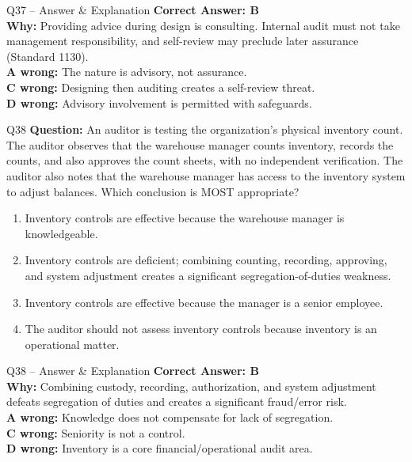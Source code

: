 \documentclass[aspectratio=169,10pt]{beamer}
\begin{document}
	\begin{frame}[t]{Q37 -- Answer \& Explanation}
		\small
		\textbf{Correct Answer: B} \\[4pt]
		\textbf{Why:} Providing advice during design is consulting. Internal audit must not take management responsibility, and self-review may preclude later assurance (Standard 1130). \\[4pt]
		\textbf{A wrong:} The nature is advisory, not assurance. \\[2pt]
		\textbf{C wrong:} Designing then auditing creates a self-review threat. \\[2pt]
		\textbf{D wrong:} Advisory involvement is permitted with safeguards.
	\end{frame}
	
	\begin{frame}[t]{Q38}
		\small
		\textbf{Question:} An auditor is testing the organization's physical inventory count. The auditor observes that the warehouse manager counts inventory, records the counts, and also approves the count sheets, with no independent verification. The auditor also notes that the warehouse manager has access to the inventory system to adjust balances. Which conclusion is MOST appropriate?
		\begin{enumerate}[label=\Alph*.,itemsep=1pt,topsep=2pt]
			\item Inventory controls are effective because the warehouse manager is knowledgeable.
			\item Inventory controls are deficient; combining counting, recording, approving, and system adjustment creates a significant segregation-of-duties weakness.
			\item Inventory controls are effective because the manager is a senior employee.
			\item The auditor should not assess inventory controls because inventory is an operational matter.
		\end{enumerate}
	\end{frame}
	
	\begin{frame}[t]{Q38 -- Answer \& Explanation}
		\small
		\textbf{Correct Answer: B} \\[4pt]
		\textbf{Why:} Combining custody, recording, authorization, and system adjustment defeats segregation of duties and creates a significant fraud/error risk. \\[4pt]
		\textbf{A wrong:} Knowledge does not compensate for lack of segregation. \\[2pt]
		\textbf{C wrong:} Seniority is not a control. \\[2pt]
		\textbf{D wrong:} Inventory is a core financial/operational audit area.
	\end{frame}
	
\end{document}
